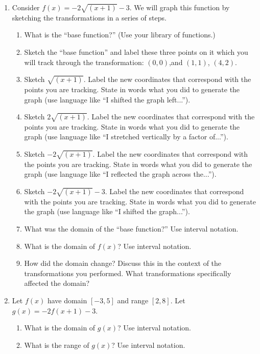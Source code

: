 \documentclass[12pt]{amsart}
\begin{document}
\begin{enumerate}
\item Consider $f(x)= -2\sqrt{(x+1)}-3.$  We will graph this function by sketching the transformations in a series of steps.
\begin{enumerate}
\item What is the ``base function?'' (Use your library of functions.)
\item Sketch the ``base function'' and label these three points on it which you will track through the transformation: $(0,0)$,and $(1,1)$, $(4,2)$.
\item Sketch $\sqrt{(x+1)}$.  Label the new coordinates that correspond with the points you are tracking.  State in words what you did to generate the graph (use language like ``I shifted the graph left...'').
\item Sketch $2\sqrt{(x+1)}$. Label the new coordinates that correspond with the points you are tracking.  State in words what you did to generate the graph (use language like ``I stretched vertically by a factor of...'').
\item Sketch $-2\sqrt{(x+1)}$. Label the new coordinates that correspond with the points you are tracking.  State in words what you did to generate the graph (use language like ``I reflected the graph across the...'').
\item Sketch $-2\sqrt{(x+1)}-3$. Label the new coordinates that correspond with the points you are tracking.  State in words what you did to generate the graph (use language like ``I shifted the graph...'').
\item What was the domain of the ``base function?''  Use interval notation.
\item What is the domain of $f(x)$? Use interval notation.
\item How did the domain change?  Discuss this in the context of the transformations you performed.  What transformations specifically affected the domain? 
\end{enumerate}

\item Let $f(x)$ have domain $[-3,5]$ and range $[2, 8]$.  Let $g(x)=-2f(x+1)-3$.
\begin{enumerate}
\item What is the domain of $g(x)$?  Use interval notation.
\item What is the range of $g(x)$?  Use interval notation.
\end{enumerate}



\end{enumerate}
\end{document}
